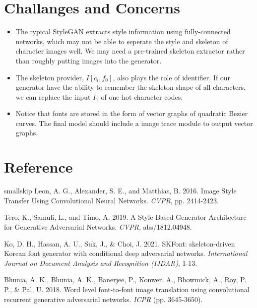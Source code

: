 \documentclass[letterpaper]{article}
\begin{document}
\section{Challanges and Concerns}
\begin{itemize}
    \item The typical StyleGAN extracts style information using fully-connected networks, which may not be able to seperate the style and skeleton of character images well. We may need a pre-trained skeleton extractor rather than roughly putting images into the generator.
    \item The skeleton provider, $I[c_i,f_0]$, also plays the role of identifier. If our generator have the ability to remember the skeleton shape of all characters, we can replace the input $I_1$ of one-hot character codes.
    \item Notice that fonts are stored in the form of vector graphs of quadratic Bezier curves. The final model should include a image trace module to output vector graphs.
\end{itemize}

\section{Reference}
smallskip \noindent
Leon, A. G., Alexander, S. E., and Matthias, B. 2016. Image Style Transfer Using Convolutional Neural Networks. \textit{CVPR}, pp. 2414-2423.

\smallskip \noindent
Tero, K., Samuli, L., and Timo, A. 2019. A Style-Based Generator Architecture for Generative Adversarial Networks. \textit{CVPR}, abs/1812.04948.

\smallskip \noindent
Ko, D. H., Hassan, A. U., Suk, J., & Choi, J. 2021. SKFont: skeleton-driven Korean font generator with conditional deep adversarial networks. \textit{International Journal on Document Analysis and Recognition (IJDAR)}, 1-13.

\smallskip \noindent
Bhunia, A. K., Bhunia, A. K., Banerjee, P., Konwer, A., Bhowmick, A., Roy, P. P., & Pal, U. 2018. Word level font-to-font image translation using convolutional recurrent generative adversarial networks. \textit{ICPR} (pp. 3645-3650).





\end{document}
